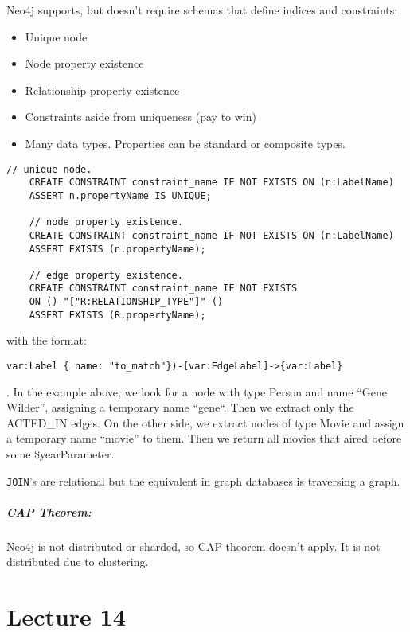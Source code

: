 \documentclass{report}
\newenvironment{example}{\begin{tcolorbox}[title={Example},colback=green!5!white,colframe=black!75!green]}{\end{tcolorbox}}
\renewcommand{\tt}[1]{\texttt{{#1}}}
\begin{document}
Neo4j supports, but doesn't require schemas that define indices and constraints:
\begin{itemize}[label=$\to$]
    \item Unique node
    \item Node property existence
    \item Relationship property existence
    \item Constraints aside from uniqueness (pay to win)
    \item Many data types. Properties can be standard or composite types.
\end{itemize}
\begin{example}
\begin{lstlisting}[language=Cypher, style=colorEX]
    // unique node.
    CREATE CONSTRAINT constraint_name IF NOT EXISTS ON (n:LabelName)
    ASSERT n.propertyName IS UNIQUE;

    // node property existence.
    CREATE CONSTRAINT constraint_name IF NOT EXISTS ON (n:LabelName)
    ASSERT EXISTS (n.propertyName);

    // edge property existence.
    CREATE CONSTRAINT constraint_name IF NOT EXISTS
    ON ()-"["R:RELATIONSHIP_TYPE"]"-()
    ASSERT EXISTS (R.propertyName);
\end{lstlisting}
with the format:
\begin{BVerbatim}
var:Label { name: "to_match"})-[var:EdgeLabel]->{var:Label}
\end{BVerbatim}
. In the example above, we look for a node with type Person and name
``Gene Wilder'', assigning a temporary name ``gene``. Then we extract only the
ACTED\_IN edges. On the other side, we extract nodes of type Movie and assign a
temporary name ``movie'' to them. Then we return all movies that aired before some
\$yearParameter.
\end{example}

\tt{JOIN}'s are relational but the equivalent in graph databases is traversing a
graph.

\paragraph{CAP Theorem:} Neo4j is not distributed or sharded, so CAP theorem
doesn't apply. It is not distributed due to clustering.


\chapter{Lecture 14}
\end{document}
